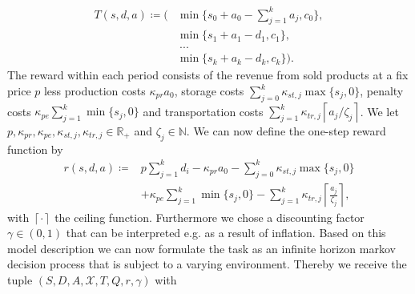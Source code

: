 \documentclass[journal, a4paper]{IEEEtran}
\theoremstyle{plain}
\theoremstyle{definition}
\begin{document}
\begin{equation}
\label{eq:transition_function}
	\begin{split}
		T(s, d, a) \coloneqq (&\min\{s_0 + a_0 - \sum_{j=1}^{k}a_j, c_0 \}, \\
		&\min\{s_1 + a_1 - d_1, c_1 \}, \\
		&\ ... \\
		&\min\{s_k + a_k - d_k, c_k \}).
\end{split}
\end{equation}
The reward within each period consists of the revenue from sold products at a fix price $p$ less production costs $\kappa_{pr}a_0$, storage costs $\sum_{j=0}^{k}\kappa_{st,j} \max\{s_j, 0\}$, penalty costs $\kappa_{pe} \sum_{j=1}^{k}\min\{s_j,0\}$ and transportation costs $\sum_{j=1}^{k} \kappa_{tr, j} \left\lceil a_j / \zeta_j \right\rceil$. We let $p, \kappa_{pr}, \kappa_{pe}, \kappa_{st, j}, \kappa_{tr,j} \in \mathbb{R}_+$ and $\zeta_j \in \mathbb{N}$. We can now define the one-step reward function by
\begin{equation}
\label{eq:one_step_reward}
	\begin{split}
		r(s, d, a) \coloneqq &p \sum_{j=1}^{k}d_i - \kappa_{pr} a_0 - \sum_{j=0}^{k} \kappa_{st, j} \max\{s_j, 0\} \\ 
		&+\kappa_{pe} \sum_{j=1}^{k}\min\{s_j, 0\} - \sum_{j=1}^{k} \kappa_{tr, j} \left\lceil \frac{a_j}{\zeta_j} \right\rceil,
	\end{split}
\end{equation}
with $\left\lceil \cdot \right\rceil$ the ceiling function. Furthermore we chose a discounting factor $\gamma \in (0,1)$ that can be interpreted e.g. as a result of inflation. \newline Based on this model description we can now formulate the task as an infinite horizon markov decision process that is subject to a varying environment. Thereby we receive the tuple $(S, D, A, \mathcal{X}, T, Q, r, \gamma)$ with
\end{document}
